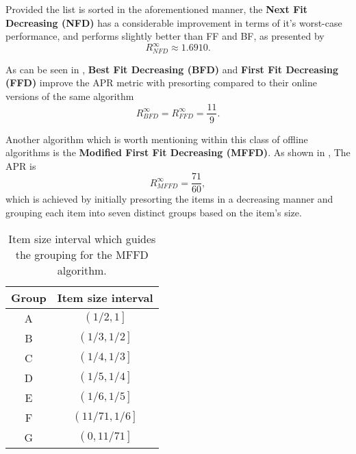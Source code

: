 Provided the list is sorted in the aforementioned manner, the \textbf{Next Fit Decreasing (NFD)} has a considerable improvement in terms of it's worst-case performance, and performs slightly better than FF and BF, as presented by \cite{baker1981tight}
\begin{equation}
    R_{NFD}^\infty \approx 1.6910.
\end{equation}

As can be seen in \cite{johnson1974worst}, \textbf{Best Fit Decreasing (BFD)} and \textbf{First Fit Decreasing (FFD)} improve the APR metric with presorting compared to their online versions of the same algorithm 
\begin{equation}
    R_{BFD}^\infty = R_{FFD}^\infty = \frac{11}{9}.
\end{equation}

Another algorithm which is worth mentioning within this class of offline algorithms is the \textbf{Modified First Fit Decreasing (MFFD)}. As shown in \cite{johnson19857160}, The APR is
\begin{equation}
    R_{MFFD}^\infty = \frac{71}{60},
\end{equation}
which is achieved by initially presorting the items in a decreasing manner and grouping each item into seven distinct groups based on the item's size. 

\begin{table}[H]
\caption{Item size interval which guides the grouping for the MFFD algorithm.}
\begin{center}
\begin{tabular}{ |c|c| } 
    \hline
    Group & Item size interval \\ 
    \hline
    A & $\left( 1/2, 1 \right]$ \\ 
    B & $\left( 1/3, 1/2 \right]$ \\ 
    C & $\left( 1/4, 1/3 \right]$ \\ 
    D & $\left( 1/5, 1/4 \right]$ \\ 
    E & $\left( 1/6, 1/5 \right]$ \\ 
    F & $\left( 11/71, 1/6 \right]$ \\ 
    G & $\left( 0, 11/71 \right]$ \\ 
\hline
\end{tabular}
\end{center}
\end{table}

